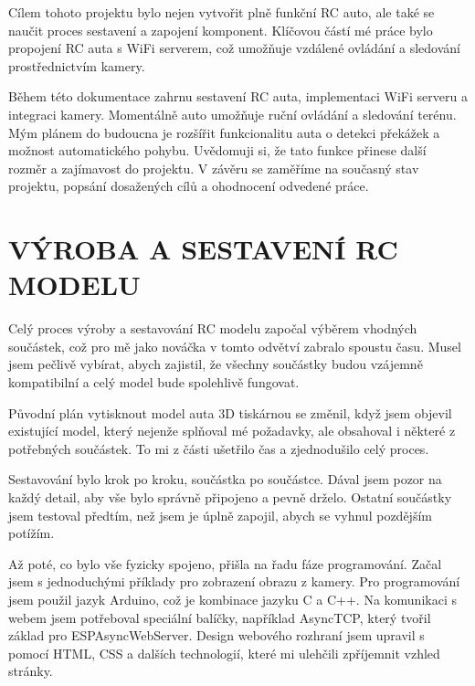 \documentclass[12pt, a4paper,
oneside,      %
openany
]{report}
\begin{document}
\noindent Cílem tohoto projektu bylo nejen vytvořit plně funkční RC auto, ale také se naučit proces sestavení a zapojení komponent. Klíčovou částí mé práce bylo propojení RC auta s WiFi serverem, což umožňuje vzdálené ovládání a sledování prostřednictvím kamery.

\noindent Během této dokumentace zahrnu sestavení RC auta, implementaci WiFi serveru a integraci kamery. Momentálně auto umožňuje ruční ovládání a sledování terénu. Mým plánem do budoucna je rozšířit funkcionalitu auta o detekci překážek a možnost automatického pohybu. Uvědomuji si, že tato funkce přinese další rozměr a zajímavost do projektu. V závěru se zaměříme na současný stav projektu, popsání dosažených cílů a ohodnocení odvedené práce.


\pagestyle{plain}
\chapter{VÝROBA A SESTAVENÍ RC MODELU}
\noindent Celý proces výroby a sestavování RC modelu započal výběrem vhodných součástek, což pro mě jako nováčka v tomto odvětví zabralo spoustu času. Musel jsem pečlivě vybírat, abych zajistil, že všechny součástky budou vzájemně kompatibilní a celý model bude spolehlivě fungovat.

\noindent Původní plán vytisknout model auta 3D tiskárnou se změnil, když jsem objevil existující model, který nejenže splňoval mé požadavky, ale obsahoval i některé z potřebných součástek. To mi z části ušetřilo čas a zjednodušilo celý proces.

\noindent Sestavování bylo krok po kroku, součástka po součástce. Dával jsem pozor na každý detail, aby vše bylo správně připojeno a pevně drželo. Ostatní součástky jsem testoval předtím, než jsem je úplně zapojil, abych se vyhnul pozdějším potížím.

\noindent Až poté, co bylo vše fyzicky spojeno, přišla na řadu fáze programování. Začal jsem s jednoduchými příklady pro zobrazení obrazu z kamery. Pro programování jsem použil jazyk Arduino, což je kombinace jazyku C a C++. Na komunikaci s webem jsem potřeboval speciální balíčky, například AsyncTCP, který tvořil základ pro ESPAsyncWebServer. Design webového rozhraní jsem upravil s pomocí HTML, CSS a dalších technologií, které mi ulehčili zpříjemnit vzhled stránky.
\newpage
\end{document}
